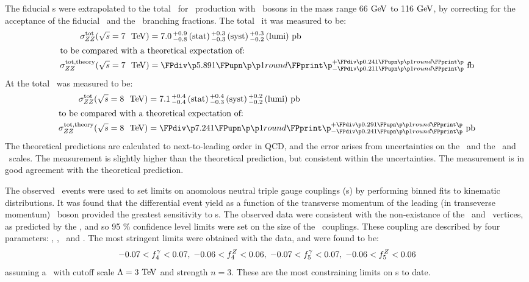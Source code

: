 The fiducial \cx s were extrapolated to the total \cx\ for \ZZ\
production with \Z\ bosons in the mass range 66$\GeV$ to 116$\GeV$, by
correcting for the acceptance of the fiducial \phasespace\ and the \Zll\
branching fractions. The total \cx\ it  was measured to be:
\begin{align}
\sigmaTotZZ(\sqrtseq{7}) &= \ZZSevenTeVTotalCrossSection \\
\intertext{to be compared with a theoretical expectation of:}
\sigmaTotTheoryZZ(\sqrtseq{7}) &= \ZZSevenTeVTheoryTotalCrossSection
\end{align}
At \sqrtseq{8} the total \cx\ was measured to be:
\begin{align}
\sigmaTotZZ(\sqrtseq{8}) &= \ZZEightTeVTotalCrossSection \\
\intertext{to be compared with a theoretical expectation of:}
\sigmaTotTheoryZZ(\sqrtseq{8}) &= \ZZEightTeVTheoryTotalCrossSection
\end{align}
The theoretical predictions are calculated to next-to-leading order in QCD, and
the error arises from uncertainties on the \partDF\ and the \fact\ and \renorm\
scales. The  measurement is slightly higher than the theoretical prediction,
but consistent within the uncertainties. The \sqrtseq{8} measurement is in good
agreement with the theoretical prediction. 

The observed \ZZllll\ events were used to set limits on anomolous neutral triple
gauge couplings (\nTGC s) by performing binned fits to kinematic distributions.
It was found that the differential event yield as a function of the transverse
momentum of the leading (in transeverse momentum) \Z\ boson provided the
greatest sensitivity to \TGC s. The observed data were consistent with the non-existance of the
\ZZZ\ and \ZZg\ vertices, as predicted by the \sm, and so 95 \% confidence level
limits were set on the size of the \TGC\ couplings. These coupling are
described by four parameters: \ffourg, \ffourZ, \ffiveg\ and \ffiveZ. The
most stringent limits were obtained with the \sqrtseq{8} data, and were found to
be:
\begin{align}
-0.07 < f_{4}^{\gamma} < 0.07, \; -0.06 < f_{4}^{Z} < 0.06, \; -0.07 < f_{5}^{\gamma} < 0.07, \;
-0.06 < f_{5}^{Z} < 0.06
\end{align}
assuming a \formfactor\ with cutoff scale $\Lambda=3 \tev$ and strength $n=3$.
These are the most constraining limits on \TGC s to date.

